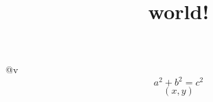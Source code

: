 \documentclass{article}
\begin{document}
\title{world!}
@v
\[a^2 +b^2 = c^2\]
\[(x,y )\]
\end{document}
